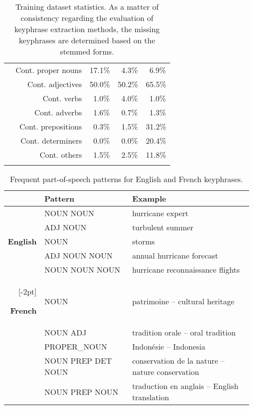 \begin{table}[h]
\begin{tabular}{@{~}r@{~}r@{~}c@{~}c@{~}c@{~}}
        & Cont. proper nouns & 17.1\% & $~~$4.3\% & $~~$6.9\%\\
        & Cont. adjectives & 50.0\% & 50.2\% & 65.5\%\\
        & Cont. verbs & $~~$1.0\% & $~~$4.0\% & $~~$1.0\%\\
        & Cont. adverbs & $~~$1.6\% & $~~$0.7\% & $~~$1.3\%\\
        & Cont. prepositions & $~~$0.3\% & $~~$1.5\% & 31.2\%\\
        & Cont. determiners & $~~$0.0\% & $~~$0.0\% & 20.4\%\\
        & Cont. others & $~~$1.5\% & $~~$2.5\% & 11.8\%\\
        \addlinespace[.5\defaultaddspace]
        \bottomrule
      \end{tabular}
      \caption{Training dataset statistics. As a matter of consistency regarding
               the evaluation of keyphrase extraction methods, the missing
               keyphrases are determined based on the stemmed forms.
               \label{tab:train_dataset_statistics}}
    \end{table}

    \begin{table*}
      \centering
      \begin{tabular}{rll}
        \toprule
        & \textbf{Pattern} & \textbf{Example}\\
        \midrule
        \multirow{5}{*}[-2pt]{\begin{sideways}\textbf{English}\end{sideways}} & NOUN NOUN & hurricane expert\\ %
        & ADJ NOUN & turbulent summer\\ %
        & NOUN & storms\\ %
        & ADJ NOUN NOUN & annual hurricane forecast\\ %
        & NOUN NOUN NOUN & hurricane reconnaissance flights\\ %
        \addlinespace[1.5\defaultaddspace]
        \multirow{5}{*}[-2pt]{\begin{sideways}\textbf{French}\end{sideways}} & NOUN & patrimoine -- cultural heritage\\ %
        & NOUN ADJ & tradition orale -- oral tradition\\ %
        & PROPER\_NOUN & Indonésie -- Indonesia\\ %
        & NOUN PREP DET NOUN & conservation de la nature -- nature conservation\\ %
        & NOUN PREP NOUN & traduction en anglais -- English translation\\ %
        \bottomrule
      \end{tabular}
      \caption{Frequent part-of-speech patterns for English and French
               keyphrases. \label{tab:best_patterns}}
    \end{table*}

